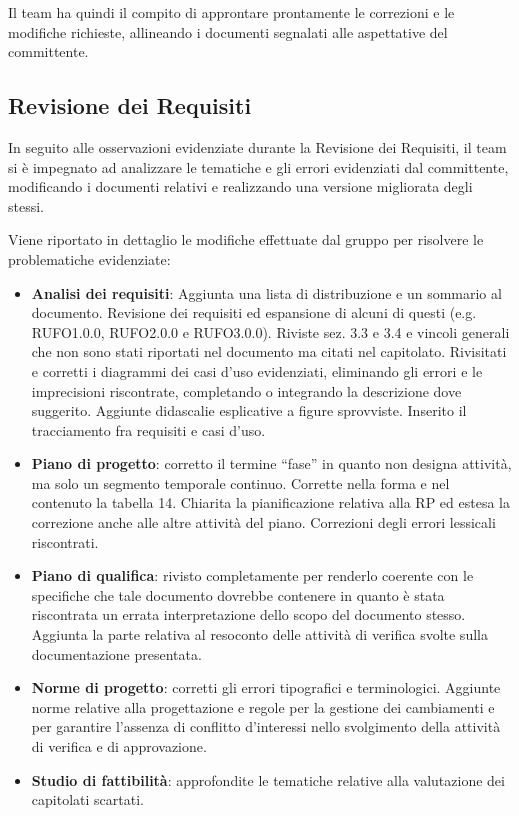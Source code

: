 Il team ha quindi il compito di approntare prontamente le correzioni e le modifiche richieste, allineando i documenti segnalati alle aspettative del committente.

\subsection{Revisione dei Requisiti}
In seguito alle osservazioni evidenziate durante la Revisione dei Requisiti, il team si è impegnato ad analizzare le tematiche e gli errori evidenziati dal committente, modificando i documenti relativi e realizzando una versione migliorata degli stessi.

Viene riportato in dettaglio le modifiche effettuate dal gruppo per risolvere le problematiche evidenziate:

\begin{itemize}
\item \textbf{Analisi dei requisiti}: Aggiunta una lista di distribuzione e un sommario al documento. Revisione dei requisiti ed espansione di alcuni di questi (e.g. RUFO1.0.0, RUFO2.0.0 e RUFO3.0.0). Riviste sez. 3.3 e 3.4 e vincoli generali che non sono stati riportati nel documento ma citati nel capitolato. Rivisitati e corretti i diagrammi dei casi d'uso evidenziati, eliminando gli errori e le imprecisioni riscontrate, completando o integrando la descrizione dove suggerito. Aggiunte didascalie esplicative a figure sprovviste. Inserito il tracciamento fra requisiti e casi d'uso.

\item \textbf{Piano di progetto}: corretto il termine ``fase'' in quanto non designa attività, ma solo un segmento temporale continuo. Corrette nella forma e nel contenuto la tabella 14. Chiarita la pianificazione relativa alla \underline{} RP ed estesa la correzione anche alle altre attività del piano. Correzioni degli errori lessicali riscontrati.

\item \textbf{Piano di qualifica}: rivisto completamente per renderlo coerente con le specifiche che tale documento dovrebbe contenere in quanto è stata riscontrata un errata interpretazione dello scopo del documento stesso.
Aggiunta la parte relativa al resoconto delle attività di verifica svolte sulla documentazione presentata.

\item \textbf{Norme di progetto}: corretti gli errori tipografici e terminologici. Aggiunte norme relative alla progettazione e regole per la gestione dei cambiamenti e per garantire l'assenza di conflitto d'interessi nello svolgimento della attività di verifica e di approvazione.

\item \textbf{Studio di fattibilità}: approfondite le tematiche relative alla valutazione dei capitolati scartati.
\end{itemize}

